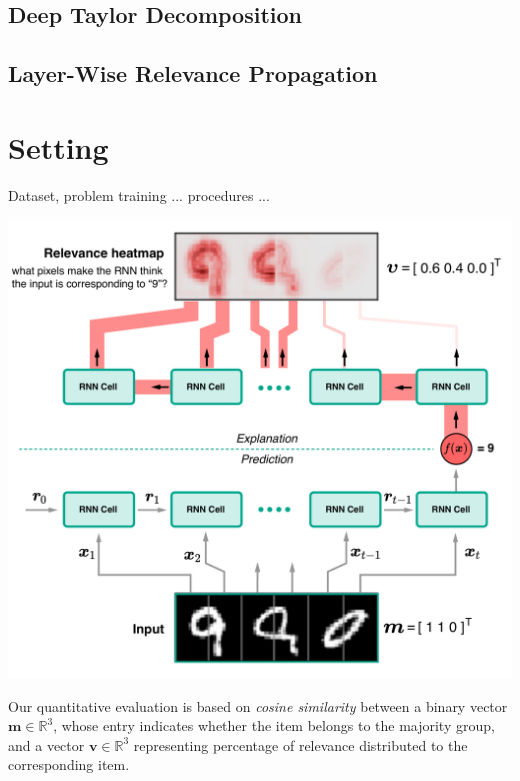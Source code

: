 \documentclass[a0,portrait]{a0poster}
\begin{document}
\begin{multicols}{2}

\subsection*{Deep Taylor Decomposition}
\cite{MontavonExplainingnonlinearclassification2017}
\subsection*{Layer-Wise Relevance Propagation}
\cite{BachPixelWiseExplanationsNonLinear2015}

\section*{Setting}
Dataset, problem training ... procedures ... 
\begin{center}\vspace{0.5cm}
\includegraphics[width=0.6\linewidth]{artificial_problem_with_rel_poster}
\end{center}\vspace{0.5cm}


Our quantitative evaluation is based on \textit{cosine similarity} between a binary vector $\boldsymbol{m} \in \mathbb{R}^3$, whose entry indicates whether the item belongs to the majority group, and a vector $\boldsymbol{v} \in \mathbb{R}^3$ representing percentage of relevance distributed to the corresponding  item.


\end{multicols}
\end{document}
